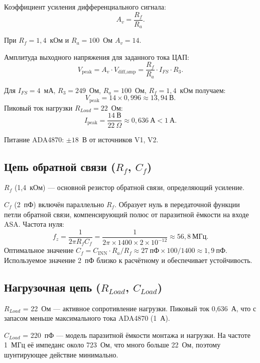\documentclass[a4paper, 12pt]{article}
\begin{document}
Коэффициент усиления дифференциального сигнала:
\begin{equation}
    A_v = \frac{R_f}{R_a}.
    \label{eq:av}
\end{equation}

При \(R_f = 1{,}4\)~кОм и \(R_a = 100\)~Ом \(A_v = 14\).

Амплитуда выходного напряжения для заданного тока ЦАП:
\begin{equation}
    V_{\text{peak}} = A_v \cdot V_{\text{diff,amp}}
    = \frac{R_f}{R_a} \cdot I_{FS} \cdot R_3.
    \label{eq:vpeak}
\end{equation}

Для \(I_{FS}=4\)~мА, \(R_3=249\)~Ом, \(R_a=100\)~Ом, \(R_f=1{,}4\)~кОм
получаем:
\[
    V_{\text{peak}} = 14 \times 0{,}996 \approx 13{,}94\ \text{В}.
\]
Пиковый ток нагрузки \(R_{Load}=22\)~Ом:
\[
    I_{\text{peak}} = \frac{14\ \text{В}}{22\ \Omega} \approx 0{,}636\ \text{А} < 1\ \text{А}.
\]

Питание ADA4870: $\pm 18$~В от источников V1, V2.

\subsection{Цепь обратной связи \texorpdfstring{(\(R_f\), \(C_f\))}{Rf, Cf}}

\textbf{\(R_f\)} (1{,}4~кОм) — основной резистор обратной связи,
определяющий усиление.

\textbf{\(C_f\)} (2~пФ) включён параллельно \(R_f\). Образует нуль
в передаточной функции петли обратной связи, компенсирующий
полюс от паразитной ёмкости на входе ASA.
Частота нуля:
\[
    f_{z} = \frac{1}{2\pi R_f C_f}
    = \frac{1}{2\pi \times 1400 \times 2\times 10^{-12}}
    \approx 56{,}8\ \text{МГц}.
\]
Оптимальное значение \(C_f = C_{\text{INN}} \cdot R_a / R_f
\approx 27\ \text{пФ} \times 100 / 1400 \approx 1{,}9\ \text{пФ}\).
Используемое значение 2~пФ близко к расчётному и обеспечивает
устойчивость.

\subsection{Нагрузочная цепь \texorpdfstring{(\(R_{Load}\), \(C_{Load}\))}{Rload, Cload}}

\textbf{\(R_{Load}\)} = 22~Ом — активное сопротивление нагрузки.
Пиковый ток 0{,}636~А, что с запасом меньше максимального тока
ADA4870 (1~А).

\textbf{\(C_{Load}\)} = 220~пФ — модель паразитной ёмкости монтажа
и нагрузки. На частоте 1~МГц её импеданс около 723~Ом, что много
больше 22~Ом, поэтому шунтирующее действие минимально.
\end{document}
